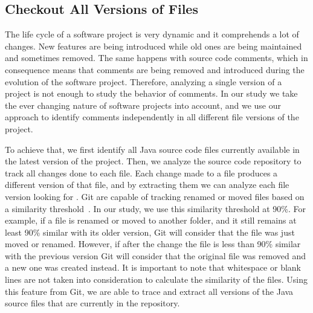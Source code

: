 \subsection{Checkout All Versions of Files}
\label{sub:checkout_all_versions_of_files}

The life cycle of a software project is very dynamic and it comprehends a lot of changes. New features are being introduced while old ones are being maintained and sometimes removed. The same happens with source code comments, which in consequence means that \SATD comments are being removed and introduced during the evolution of the software project. Therefore, analyzing a single version of a project is not enough to study the behavior of \SATD comments. In our study we take the ever changing nature of software projects into account, and we use our approach to identify \SATD comments independently in all different file versions of the project.



To achieve that, we first identify all Java source code files currently available in the latest version of the project. Then, we analyze the source code repository to track all changes done to each file. Each change made to a file produces a different version of that file, and by extracting them we can analyze each file version looking for \SATD. Git are capable of tracking  renamed or moved files based on a similarity threshold~\cite{BirdMSR2009,HataIWPSE-EVOL2011}. In our study, we use this similarity threshold at 90\%. For example, if a file is renamed or moved to another folder, and it still remains at least 90\% similar with its older version, Git will consider that the file was just moved or renamed. However, if after the change the file is less than 90\% similar with the previous version Git will consider that the original file was removed and a new one was created instead. It is important to note that whitespace or blank lines are not taken into consideration to calculate the similarity of the files. Using this feature from Git, we are able to trace and extract all versions of the Java source files that are currently in the repository. 

